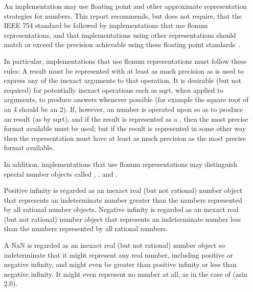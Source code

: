 \vest An implementation may use floating point and other approximate 
representation strategies for  numbers.
%
%
This report recommends, but does not require, that the IEEE 754
standard be followed by implementations that use
flonum representations, and that implementations using
other representations should match or exceed the precision achievable
using these floating point standards~\cite{IEEE}.

\vest In particular, implementations that use flonum representations
must follow these rules: A  result
must be represented with at least as much precision as is used to express any of
the inexact arguments to that operation.  It is desirable (but not required) for
potentially inexact operations such as {\cf sqrt}, when applied to 
arguments, to produce  answers whenever possible (for example the
square root of an  4 should be an  2).
If, however, an
 number is operated upon so as to produce an  result
(as by {\cf sqrt}), and if the result is represented as a , then
the most precise  format available must be used; but if the result
is represented in some other way then the representation must have at least as
much precision as the most precise  format available.

In addition, implementations that use flonum representations may
distinguish special number objects called ,
, and .

Positive infinity is regarded as an inexact real (but not rational)
number object that represents an indeterminate number greater than the
numbers represented by all rational number objects. Negative infinity
is regarded as an inexact real (but not rational) number object that
represents an indeterminate number less than the numbers represented
by all rational numbers.

A NaN is regarded as an inexact real (but not rational) number object
so indeterminate that it might represent any real number, including
positive or negative infinity, and might even be greater than positive
infinity or less than negative infinity.
It might even represent no number at all, as in the case of 
{\cf (asin 2.0)}.

